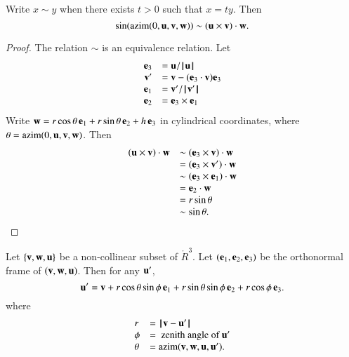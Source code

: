 \begin{lemma}\label{lemma:sim}
Write $x\sim y$ when there exists $t>0$ such that $x= t y$. 
Then 
$$\sin(\op{azim}(0,\u,\v,\w))\sim (\u \times \v)\cdot \w.$$
\end{lemma}

\begin{proof}
The relation $\sim$ is an equivalence relation.
Let
$$
\begin{array}{rll}
   \e_3 &= \u/\normo{\u}\\
   \v' &= \v - (\e_3\cdot \v) \e_3\\
   \e_1 &= \v'/\normo{\v'}\\
   \e_2 &= \e_3 \times \e_1 \\
\end{array}
$$
Write $\w= r\cos\theta\, \e_1 + r\sin\theta \, \e_2 + h\, \e_3$ in cylindrical coordinates, where $\theta = \op{azim}(0,\u,\v,\w)$.
Then
$$
\begin{array}{rll}
   (\u\times \v)\cdot \w &\sim (\e_3\times \v)\cdot \w\\
   &= (\e_3\times \v')\cdot \w\\
   &\sim (\e_3\times \e_1)\cdot \w\\
   &= \e_2 \cdot \w\\
   &= r\sin\theta \\
   &\sim \sin\theta.
\end{array}
$$
\end{proof}

\begin{lemma}\label{lemma:sph}
Let $\{\v,\w,\u\}$ %
be a non-collinear subset of $\ring{R}^3$.
Let $(\e_1,\e_2,\e_3)$ be the orthonormal frame of $(\v,\w,\u)$.
  Then for any $\u'$,
   \begin{equation}
   \u' = \v + r \cos\theta \sin\phi\, \e_1 + r \sin\theta\sin\phi\, \e_2 +
   r\cos\phi\,\e_3.
   \label{eqn:sph}
   \end{equation}
where
$$
\begin{array}{lll}
r &= \norm{\v }{ \u'}\\
\phi &= \text{ zenith angle of } \u'\\
\theta &=\op{azim}(\v,\w,\u,\u').
\end{array}
$$
\end{lemma}
%
%
%
%
%
%

